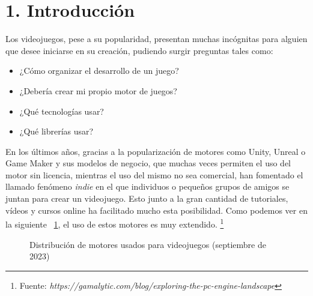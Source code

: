 \chapter*{1. Introducción}\label{cap:intro}

Los videojuegos, pese a su popularidad, presentan muchas incógnitas para alguien que desee iniciarse en su creación, 
pudiendo surgir preguntas tales como:
\begin{itemize}
    \item ¿Cómo organizar el desarrollo de un juego?
    \item ¿Debería crear mi propio motor de juegos?
    \item ¿Qué tecnologías usar?
    \item ¿Qué librerías usar?
\end{itemize}

En los últimos años, gracias a la popularización de motores como Unity\cite{unity}, Unreal\cite{unreal} o
Game Maker\cite{gamemaker} y sus modelos de negocio, que muchas veces permiten el uso del motor sin licencia, mientras el uso
del mismo no sea comercial\cite{unity-pricing}\cite{unreal-pricing}\cite{gamemaker-pricing}, han fomentado el llamado fenómeno \textit{indie} en el que individuos o pequeños grupos de
amigos se juntan para crear un videojuego. Esto junto a la gran cantidad de tutoriales, vídeos y cursos online
ha facilitado mucho esta posibilidad. Como podemos ver en la siguiente \figurename~\ref{engine_distribution}, el uso de estos motores es muy extendido. \footnote{Fuente: \textit{https://gamalytic.com/blog/exploring-the-pc-engine-landscape}}

\begin{figure}[h!]
    \centering
    
    
    \caption{Distribución de motores usados para videojuegos (septiembre de 2023)}
    \label{engine_distribution}
\end{figure}

